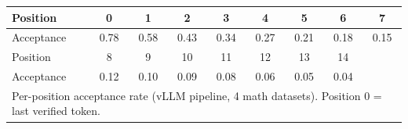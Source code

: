 \centering
\begin{tabular}{l|cccccccc}
\toprule
Position & 0 & 1 & 2 & 3 & 4 & 5 & 6 & 7 \\
\midrule
Acceptance & 0.78 & 0.58 & 0.43 & 0.34 & 0.27 & 0.21 & 0.18 & 0.15 \\
\midrule
Position & 8 & 9 & 10 & 11 & 12 & 13 & 14 & \\
\midrule
Acceptance & 0.12 & 0.10 & 0.09 & 0.08 & 0.06 & 0.05 & 0.04 & \\
\midrule
\multicolumn{9}{l}{\footnotesize Per-position acceptance rate (vLLM pipeline, 4 math datasets). Position 0 = last verified token.} \\
\bottomrule
\end{tabular}
